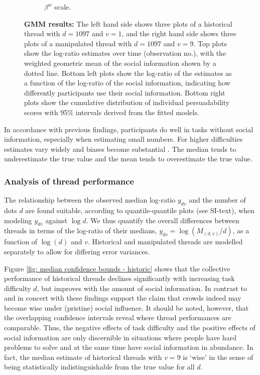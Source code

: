 \documentclass[9pt,a4paper,twocolumn,lineno]{article}
\begin{document}
\begin{figure}[h]
\begin{subfigure}{.1\linewidth}
		\caption{\footnotesize $\beta^w$ scale.}
	\end{subfigure}
	\caption{\footnotesize \textbf{GMM results:} The left hand side shows three plots of a historical thread with $d=1097$ and $v=1$, and the right hand side shows three plots of a manipulated thread with $d=1097$ and $v=9$. Top plots show the log-ratio estimates over time (observation no.), with the weighted geometric mean of the social information shown by a dotted line. Bottom left plots show the log-ratio of the estimates as a function of the log-ratio of the social information, indicating how differently participants use their social information. Bottom right plots show the cumulative distribution of individual persuadability scores with 95\% intervals derived from the fitted models.}
\label{fig: social influence}
\end{figure}

In accordance with previous findings, participants do well in tasks without social information, especially when estimating small numbers. For higher difficulties estimates vary widely and biases become substantial \cite{indow1977scaling, izard2008calibrating, krueger1982single, krueger1984perceived, kao2018counteracting}. The median tends to underestimate the true value and the mean tends to overestimate the true value. %

\subsubsection*{Analysis of thread performance}
The relationship between the observed median log-ratio $y_{dv}$ and the number of dots $d$ are found suitable, according to quantile-quantile plots (see SI-text), when modeling $y_{dv}$ against $\log{d}$. We thus quantify the overall differences between threads in terms of the log-ratio of their medians, $y_{dv}=\log(M_{(d,v)}/d)$, as a function of $\log(d)$ and $v$. Historical and manipulated threads are modelled separately to allow for differing error variances.

Figure \ref{fig: median confidence bounds - historic} shows that the collective performance of historical threads declines significantly with increasing task difficulty $d$, but improves with the amount of social information. In contrast to \cite{lorenz2011social, king2011true, minson2012cost} and in concert with \cite{gurccay2015power, becker2017network, jayles2017social, farrell2011social} these findings support the claim that crowds indeed may become wise under (pristine) social influence. It should be noted, however, that the overlapping confidence intervals reveal where thread performances are comparable. Thus, the negative effects of task difficulty and the positive effects of social information are only discernible in situations where people have hard problems to solve and at the same time have social information in abundance. In fact, the median estimate of historical threads with $v=9$ is `wise' in the sense of being statistically indistinguishable from the true value for all $d$. 
\end{document}
